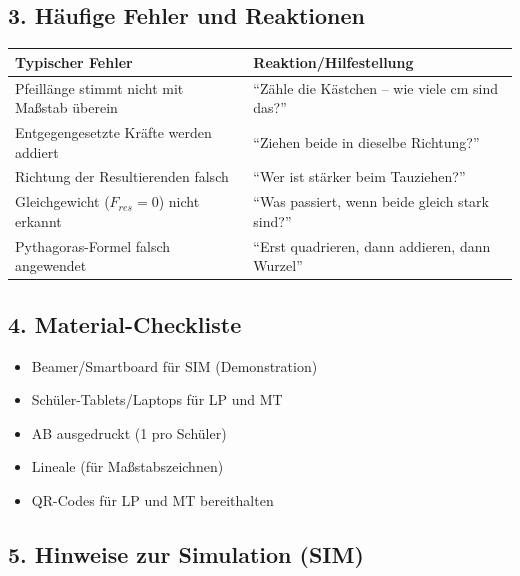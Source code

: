 \documentclass[a4paper,11pt]{article}
\begin{document}
\vspace{0.3cm}

\subsection*{3. Häufige Fehler und Reaktionen}

\begin{tabular}{|p{6cm}|p{7.5cm}|}
\hline
\textbf{Typischer Fehler} & \textbf{Reaktion/Hilfestellung} \\
\hline
Pfeillänge stimmt nicht mit Maßstab überein & ``Zähle die Kästchen -- wie viele cm sind das?'' \\
\hline
Entgegengesetzte Kräfte werden addiert & ``Ziehen beide in dieselbe Richtung?'' \\
\hline
Richtung der Resultierenden falsch & ``Wer ist stärker beim Tauziehen?'' \\
\hline
Gleichgewicht ($F_{res}=0$) nicht erkannt & ``Was passiert, wenn beide gleich stark sind?'' \\
\hline
Pythagoras-Formel falsch angewendet & ``Erst quadrieren, dann addieren, dann Wurzel'' \\
\hline
\end{tabular}

\vspace{0.5cm}

\subsection*{4. Material-Checkliste}

\begin{itemize}[nosep]
\item[$\square$] Beamer/Smartboard für SIM (Demonstration)
\item[$\square$] Schüler-Tablets/Laptops für LP und MT
\item[$\square$] AB ausgedruckt (1 pro Schüler)
\item[$\square$] Lineale (für Maßstabszeichnen)
\item[$\square$] QR-Codes für LP und MT bereithalten
\end{itemize}

\vspace{0.5cm}

\subsection*{5. Hinweise zur Simulation (SIM)}
\end{document}

